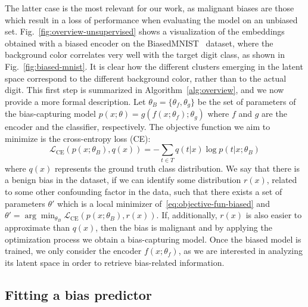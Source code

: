 \noindent The latter case is the most relevant for our work, as malignant biases are those which result in a loss of performance when evaluating the model on an unbiased set.
Fig.~\ref{fig:overview-unsupervised} shows a visualization of the embeddings obtained with a biased encoder on the BiasedMNIST~\cite{bahng2019rebias} dataset, where the background color correlates very well with the target digit class, as shown in Fig.~\ref{fig:biased-mnist}.
It is clear how the different clusters emerging in the latent space correspond to the different background color, rather than to the actual digit.
This first step is summarized in Algorithm~\ref{alg:overview}, and we now provide a more formal description.
Let $\theta_B = \{\theta_f, \theta_g\}$ be the set of parameters of the bias-capturing model $p(x; \theta) = g(f(x; \theta_f); \theta_g)$ where $f$ and $g$ are the encoder and the classifier, respectively. The objective function we aim to minimize is the cross-entropy loss (CE):
\begin{equation}
    \label{eq:objective-fun-biased}
    \mathcal{L}_\text{CE}(p(x; \theta_B), q(x)) = -\sum_{t \in T} q(t|x) \log p(t|x;\theta_B)
\end{equation}
where $q(x)$ represents the ground truth class distribution. We say that there is a benign bias in the dataset, if we can identify some distribution $r(x)$, related to some other confounding factor in the data, such that there exists a set of parameters $\theta'$ which is a local minimizer of~\eqref{eq:objective-fun-biased} and
$\theta' = \arg\!\min_{\theta_B} \mathcal{L}_\text{CE}(p(x; \theta_B), r(x))$. 
If, additionally, $r(x)$ is also easier to approximate than $q(x)$, then the bias is malignant and by applying the optimization process we obtain a bias-capturing model.
Once the biased model is trained, we only consider the encoder $f(x; \theta_f)$, as we are interested in analyzing its latent space in order to retrieve bias-related information. 

\subsection{Fitting a bias predictor}
\label{sec:phase2}

